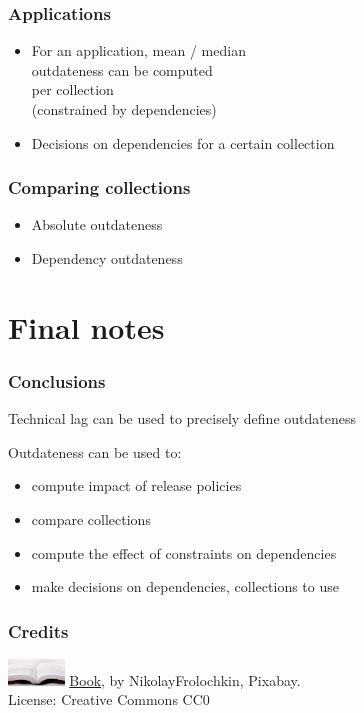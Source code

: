 \documentclass[17pt,aspectratio=169,hyperref={pdfusetitle,colorlinks,allcolors=olive}]{beamer}
\begin{document}
\begin{frame}[fragile]
  \frametitle{Applications}

  \begin{itemize}
  \item For an application, mean / median \\
    outdateness can be computed \\
    per collection \\
    (constrained by dependencies) \\
  \item Decisions on dependencies for a certain collection
  \end{itemize}
\end{frame}


\begin{frame}[fragile]
  \frametitle{Comparing collections}

  \begin{itemize}
  \item Absolute outdateness
  \item Dependency outdateness
  \end{itemize}
\end{frame}


\section{Final notes}

\begin{frame}[fragile]
  \frametitle{Conclusions}

  Technical lag can be used to precisely define outdateness

  Outdateness can be used to:
  
  \begin{itemize}
  \item compute impact of release policies
  \item compare collections
  \item compute the effect of constraints on dependencies
  \item make decisions on dependencies, collections to use
  \end{itemize}
\end{frame}



\begin{frame}[fragile]
  \frametitle{Credits}

  \includegraphics[width=1.5cm]{figs/bookpages}
  {\small \href{https://pixabay.com/en/book-reading-library-literature-1261800/}{Book}, by NikolayFrolochkin, Pixabay. \\ License: Creative Commons CC0 \\}


\end{frame}
\end{document}
